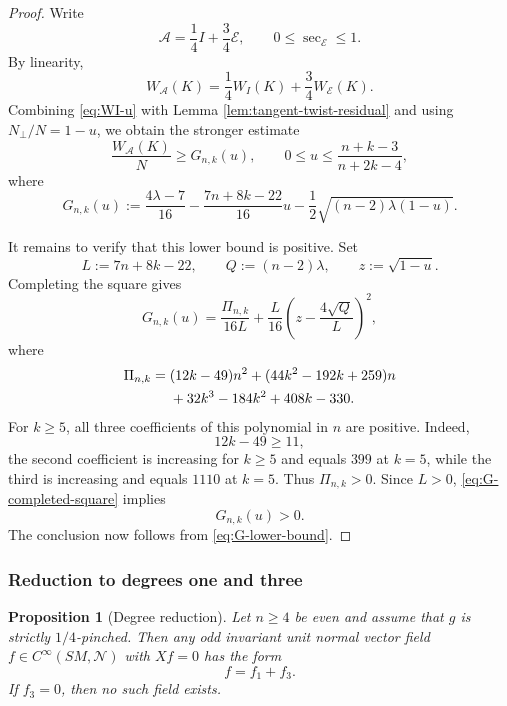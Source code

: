 \documentclass[reqno,11pt]{amsart}
\newtheorem{proposition}[theorem]{Proposition}
\theoremstyle{definition}
\newcommand{\SM}{SM}
\newcommand{\cN}{\mathcal N}
\newcommand{\cA}{\mathcal A}
\newcommand{\cE}{\mathcal E}
\begin{document}
\begin{proof}
Write
$$
  \cA=\frac14I+\frac34\cE,
  \qquad
  0\leq\sec_{\cE}\leq1.
$$
By linearity,
$$
  W_{\cA}(K)=\frac14W_I(K)+\frac34W_{\cE}(K).
$$
Combining \eqref{eq:WI-u} with
Lemma \ref{lem:tangent-twist-residual} and using
$N_{\perp}/N=1-u$, we obtain the stronger estimate
\begin{equation}\label{eq:G-lower-bound}
  \frac{W_{\cA}(K)}N\geq G_{n,k}(u),
  \qquad
  0\leq u\leq\frac{n+k-3}{n+2k-4},
\end{equation}
where
\begin{equation}\label{eq:Gnk}
  G_{n,k}(u)
  :=\frac{4\lambda-7}{16}
  -\frac{7n+8k-22}{16}u
  -\frac12\sqrt{(n-2)\lambda(1-u)}.
\end{equation}

It remains to verify that this lower bound is positive. Set
$$
  L:=7n+8k-22,
  \qquad
  Q:=(n-2)\lambda,
  \qquad
  z:=\sqrt{1-u}.
$$
Completing the square gives
\begin{equation}\label{eq:G-completed-square}
  G_{n,k}(u)
  =\frac{\Pi_{n,k}}{16L}
   +\frac{L}{16}
    \left(z-\frac{4\sqrt Q}{L}\right)^2,
\end{equation}
where
\begin{align}
  \Pi_{n,k}
  ={}&(12k-49)n^2
     +(44k^2-192k+259)n \notag\\
    &+32k^3-184k^2+408k-330.
  \notag
\end{align}
For $k\geq5$, all three coefficients of this polynomial in $n$ are
positive. Indeed,
$$
  12k-49\geq11,
$$
the second coefficient is increasing for $k\geq5$ and equals $399$ at
$k=5$, while the third is increasing and equals $1110$ at $k=5$.
Thus $\Pi_{n,k}>0$. Since $L>0$, \eqref{eq:G-completed-square} implies
$$
  G_{n,k}(u)>0.
$$
The conclusion now follows from \eqref{eq:G-lower-bound}.
\end{proof}

\subsubsection{Reduction to degrees one and three}

\begin{proposition}[Degree reduction]\label{prop:degree-reduction}
Let $n\geq4$ be even and assume that $g$ is strictly $1/4$-pinched. Then any
odd invariant unit normal vector field
$f\in C^\infty(\SM,\cN)$ with $Xf=0$ has the form
$$
  f=f_1+f_3.
$$
If $f_3=0$, then no such field exists.
\end{proposition}
\end{document}
